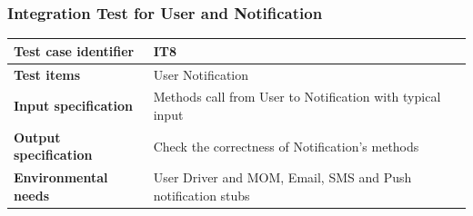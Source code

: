 \documentclass{article}
\begin{document}
			\subsubsection{Integration Test for User and Notification} \label{sec:3.1.6}
				\begin{minipage}{\linewidth}
				\end{minipage}
				\begin{center}
					\setlength{\tabcolsep}{24pt}
					\renewcommand{\arraystretch}{1.4}
					\begin{tabular}{ | l | p{8cm} |}\hline
						\textbf{Test case identifier} & IT8\\\hline
						\textbf{Test items} & User \textrightarrow Notification\\\hline
						\textbf{Input specification} & Methods call from User to Notification with typical input \\\hline
						\textbf{Output specification} & Check the correctness of Notification's methods\\\hline
						\textbf{Environmental needs} & User Driver and MOM, Email, SMS and Push notification stubs \\\hline
					\end{tabular}
				\end{center}
				\pagebreak
\end{document}
